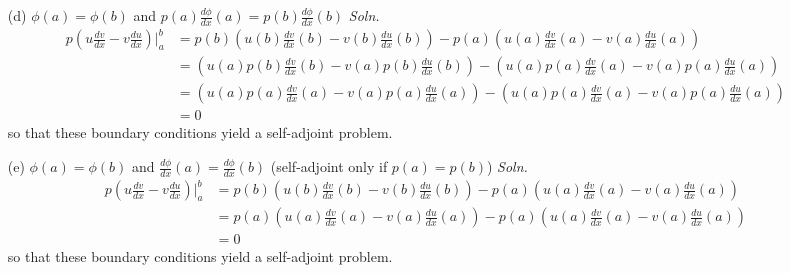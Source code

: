 \documentclass{article}
\begin{document}
\begin{itemize}
\begin{itemize}
        \item[(d)] $\phi(a) = \phi(b)$ and $p(a)\frac{d\phi}{dx}(a) = p(b)\frac{d\phi}{dx}(b)$
        \newline\newline
        \textit{Soln.}
        \begin{align*}
            p\left(u\frac{dv}{dx} - v\frac{du}{dx}\right)\bigg|_a^b &= p(b)\left(u(b)\frac{dv}{dx}(b) - v(b)\frac{du}{dx}(b)\right) - p(a)\left(u(a)\frac{dv}{dx}(a) - v(a)\frac{du}{dx}(a)\right)\\
            &= \left(u(a)p(b)\frac{dv}{dx}(b) - v(a)p(b)\frac{du}{dx}(b)\right) - \left(u(a)p(a)\frac{dv}{dx}(a) - v(a)p(a)\frac{du}{dx}(a)\right)\\
            &= \left(u(a)p(a)\frac{dv}{dx}(a) - v(a)p(a)\frac{du}{dx}(a)\right) - \left(u(a)p(a)\frac{dv}{dx}(a) - v(a)p(a)\frac{du}{dx}(a)\right)\\
            &= 0
        \end{align*}
        so that these boundary conditions yield a self-adjoint problem.

        
        \item[(e)] $\phi(a) = \phi(b)$ and $\frac{d\phi}{dx}(a) = \frac{d\phi}{dx}(b)$ (self-adjoint only if $p(a) = p(b)$)
        \newline\newline
        \textit{Soln.}
        \begin{align*}
            p\left(u\frac{dv}{dx} - v\frac{du}{dx}\right)\bigg|_a^b &= p(b)\left(u(b)\frac{dv}{dx}(b) - v(b)\frac{du}{dx}(b)\right) - p(a)\left(u(a)\frac{dv}{dx}(a) - v(a)\frac{du}{dx}(a)\right)\\
            &= p(a)\left(u(a)\frac{dv}{dx}(a) - v(a)\frac{du}{dx}(a)\right) - p(a)\left(u(a)\frac{dv}{dx}(a) - v(a)\frac{du}{dx}(a)\right)\\
            &= 0
        \end{align*}
        so that these boundary conditions yield a self-adjoint problem.


\end{itemize}
\end{itemize}
\end{document}
